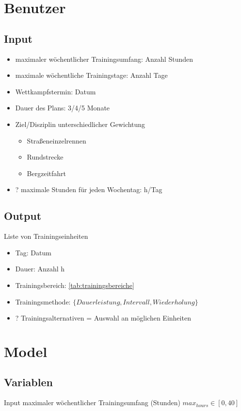 \section{Benutzer}
\subsection{Input}
\begin{itemize}
    \item maximaler wöchentlicher Trainingsumfang: Anzahl Stunden
    \item maximale wöchentliche Trainingstage: Anzahl Tage
    \item Wettkampfstermin: Datum
    \item Dauer des Plans: 3/4/5 Monate
    \item Ziel/Disziplin \cite[S.11]{Radsporttraining} unterschiedlicher Gewichtung\cite[S.14]{Radsporttraining}
    \begin{itemize}
        \item Straßeneinzelrennen
        \item Rundstrecke
        \item Bergzeitfahrt
    \end{itemize}
    \item ? maximale Stunden für jeden Wochentag: h/Tag
\end{itemize}
\subsection{Output}
Liste von Trainingseinheiten
\label{sec:modellierung:output}
    \begin{itemize}
        \item Tag: Datum
        \item Dauer: Anzahl h
        \item Trainingsbereich: \ref{tab:trainingsbereiche}
        \item Trainingsmethode: $\{Dauerleistung, Intervall, Wiederholung\}$
        \item ? Trainingsalternativen = Auswahl an möglichen Einheiten
    \end{itemize}
    
\section{Model}
    \subsection{Variablen}
        Input maximaler wöchentlicher Trainingsumfang (Stunden)
        $max_{hours} \in [0, 40]$
        
